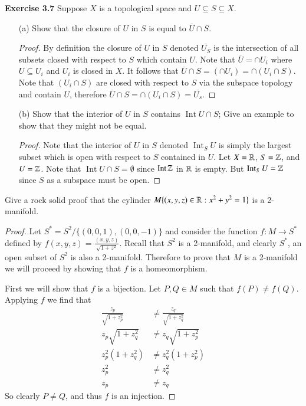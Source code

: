 \documentclass[minion]{homework651}
\DeclareMathOperator{\Int}{\mathrm{Int}}
\begin{document}
\begin{problems}
\problem \textbf{Exercise 3.7} Suppose $X$ is a topological space and $U \subseteq S \subseteq X$. 
\begin{enumerate}
    \item[(a)]  Show that the closure of $U$ in $S$ is equal to $\overline{U}\cap S$. 
    \begin{proof} By definition the closure of $U$ in $S$ denoted $\overline{U_S}$ is the intersection of all 
    subsets closed with respect to $S$ which contain $U$.  Note that $\overline{U} = \cap U_i$ where $U \subseteq U_i$ and $U_i$
    is closed in $X$. It follows that $\overline{U}\cap S = (\cap U_i) = \cap (U_i \cap S)$. Note that  $(U_i \cap S)$ are closed with respect to $S$ via 
    the subspace topology and contain $U$, therefore $\overline{U}\cap S = \cap (U_i \cap S) = \overline{U_s}$.
    \end{proof}
    \item[(b)] Show that the interior of $U$ in $S$ contains $\Int U \cap S$; Give an example to show that they might not be equal. 
    \begin{proof} Note that the interior of $U$ in $S$ denoted $\Int_S U$ is simply the largest subset which is open with respect to $S$
        contained in $U$. Let $X = \mathbb R$, $S = \mathbb Z$, and $U = \mathbb Z$. Note that $\Int U \cap S = \emptyset$ since $\Int \ZZ$ in $\mathbb R$ is empty. 
        But $\Int_S U = \ZZ$ since $S$ as a subspace must be open.  
    \end{proof}
    
\end{enumerate}

\problem Give a rock solid proof that the cylinder $M \{(x, y, z) \in \mathbb R: x^2 + y^2 = 1\}$ is a 2-manifold. 
\begin{proof} Let $S^* = S^2/\{(0,0,1), (0,0,-1)\}$ and consider the function $f: M \to S^*$ defined by $f(x, y, z) = \frac{(x, y, z)}{\sqrt{1 + z^2}}$.
    Recall that $S^2$ is a 2-manifold, and clearly $S^*$, an open subset of $S^2$ is also a 2-manifold. Therefore 
    to prove that $M$ is a 2-manifold we will proceed by showing that $f$ is a homeomorphism. 

    First we will show that $f$ is a bijection. Let $P, Q \in M$ such that $f(P) \neq f(Q)$. Applying $f$ we find that 
    \begin{align*}
        \frac{z_p}{\sqrt{1 + z_p^2}}&\neq \frac{z_q}{\sqrt{1 + z_q^2}}\\
        z_p\sqrt{1 + z_q^2}&\neq z_q \sqrt{1 + z_p^2}\\
        z_p^2(1 + z_q^2)&\neq z_q^2 (1 + z_p^2)\\
        z_p^2 &\neq  z_q^2\\
        z_p &\neq  z_q
    \end{align*}
    So clearly $P \neq Q$, and thus $f$ is an injection. 


\end{proof}
\end{problems}
\end{document}
